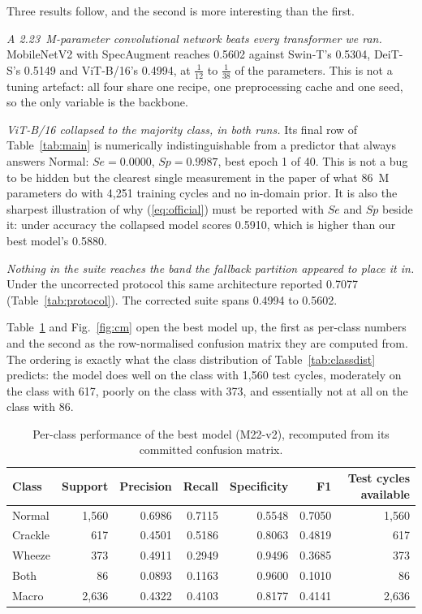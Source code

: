 \documentclass[journal,onecolumn]{IEEEtran}
\begin{document}
Three results follow, and the second is more interesting than the first.

\emph{A 2.23~M-parameter convolutional network beats every transformer we ran.}
MobileNetV2 with SpecAugment reaches 0.5602 against Swin-T's 0.5304, DeiT-S's
0.5149 and ViT-B/16's 0.4994, at $\tfrac{1}{12}$ to $\tfrac{1}{38}$ of the
parameters. This is not a tuning artefact: all four share one recipe, one
preprocessing cache and one seed, so the only variable is the backbone.

\emph{ViT-B/16 collapsed to the majority class, in both runs.} Its final row of
Table~\ref{tab:main} is numerically indistinguishable from a predictor that
always answers Normal: $Se = 0.0000$, $Sp = 0.9987$, best epoch 1 of 40. This is
not a bug to be hidden but the clearest single measurement in the paper of what
86~M parameters do with 4{,}251 training cycles and no in-domain prior. It is
also the sharpest illustration of why (\ref{eq:official}) must be reported with
$Se$ and $Sp$ beside it: under accuracy the collapsed model scores 0.5910, which
is higher than our best model's 0.5880.

\emph{Nothing in the suite reaches the band the fallback partition appeared to
place it in.} Under the uncorrected protocol this same architecture reported
0.7077 (Table~\ref{tab:protocol}). The corrected suite spans 0.4994 to 0.5602.

Table~\ref{tab:perclass} and Fig.~\ref{fig:cm} open the best model up, the first
as per-class numbers and the second as the row-normalised confusion matrix they
are computed from. The ordering is exactly what the
class distribution of Table~\ref{tab:classdist} predicts: the model does well on
the class with 1{,}560 test cycles, moderately on the class with 617, poorly on
the class with 373, and essentially not at all on the class with 86.

\begin{table}[!t]
\centering
\caption{Per-class performance of the best model (M22-v2), recomputed from its
committed confusion matrix.}
\label{tab:perclass}
\small
\begin{tabular}{lrrrrrr}
\toprule
Class & Support & Precision & Recall & Specificity & F1 & Test cycles available \\
\midrule
Normal  & 1{,}560 & 0.6986 & 0.7115 & 0.5548 & 0.7050 & 1{,}560 \\
Crackle & \phantom{0,}617 & 0.4501 & 0.5186 & 0.8063 & 0.4819 & \phantom{0,}617 \\
Wheeze  & \phantom{0,}373 & 0.4911 & 0.2949 & 0.9496 & 0.3685 & \phantom{0,}373 \\
Both    & \phantom{0,0}86 & 0.0893 & 0.1163 & 0.9600 & 0.1010 & \phantom{0,0}86 \\
\midrule
Macro   & 2{,}636 & 0.4322 & 0.4103 & 0.8177 & 0.4141 & 2{,}636 \\
\bottomrule
\end{tabular}
\end{table}
\end{document}
